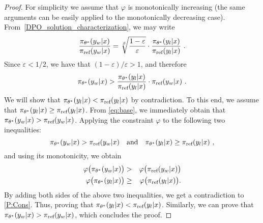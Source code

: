 \begin{proof}
For simplicity we assume that $\varphi$ is monotonically increasing (the same arguments can be easily applied to the monotonically decreasing case). From~\eqref{DPO_solution_characterization}, we may write
%
\begin{equation*}
\frac{\pi_{\theta^{*}}(y_w|x)}{\pi_{\textrm{ref}}(y_w|x)} = \sqrt[\beta]{\frac{1-\varepsilon}{\varepsilon}} \cdot \frac{\pi_{\theta^{*}}(y_l|x)}{\pi_{\textrm{ref}}(y_l|x)}\ .    
\end{equation*}
%
Since $\varepsilon < 1/2$, we have that $(1 - \varepsilon)/\varepsilon > 1$, and therefore
%
\begin{equation}
 \pi_{\theta^{*}}(y_w|x) > \frac{\pi_{\theta^*}(y_l|x)}{\pi_{\textrm{ref}}(y_l|x)} \cdot \pi_{\textrm{ref}}(y_w|x) \ .
    \label{eq:base}
\end{equation}
%
We will show that $\pi_{\theta^*}(y_l|x)<\pi_{\textrm{ref}}(y_l|x)$ by contradiction. To this end, we assume that $\pi_{\theta^*}(y_l|x)\geq\pi_{\textrm{ref}}(y_l|x)$. 
From \eqref{eq:base}, we immediately obtain that $\pi_{\theta^*}(y_w|x) > \pi_{\textrm{ref}}(y_w|x)$. Applying the constraint $\varphi$ to the following two inequalities:
%
\begin{equation*}
    \pi_{\theta^*}(y_w|x) > \pi_{\textrm{ref}}(y_w|x) \quad \text{and} \quad \pi_{\theta^*}(y_l|x) \geq \pi_{\textrm{ref}}(y_l|x) \ ,
\end{equation*}
%
and using its monotonicity, we obtain
%
\begin{eqnarray*}
    \varphi\big(\pi_{\theta^{*}}(y_w|x)\big)&>&\varphi\big(\pi_{\textrm{ref}}(y_w|x)\big) \\
    \varphi\big(\pi_{\theta^{*}}(y_l|x)\big)&\geq&\varphi\big(\pi_{\textrm{ref}}(y_l|x)\big).
\end{eqnarray*}
%
By adding both sides of the above two inequalities, we get a contradiction to \eqref{P:Cons}. Thus, proving that $\pi_{\theta^*}(y_l|x)<\pi_{\textrm{ref}}(y_l|x)$. Similarly, we can prove that $\pi_{\theta^{*}}(y_w|x)>\pi_{\textrm{ref}}(y_w|x)$, which concludes the proof.
\end{proof}

